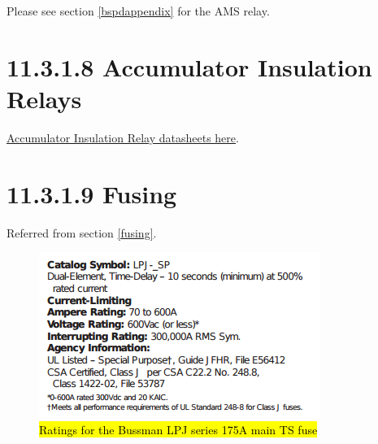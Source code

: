 \documentclass{article}
\DeclareRobustCommand{\hlr}[1]{{\sethlcolor{red}\hl{#1}}}
\begin{document}
Please see section \ref{bspdappendix} for the AMS relay.

\section*{11.3.1.8 Accumulator Insulation Relays}

\href{http://www.rec-bms.com/datasheet/Technical_datasheet_Kilovac.pdf}{Accumulator Insulation Relay datasheets here}.

\section*{11.3.1.9 Fusing} \label{fusingappendix}

Referred from section \ref{fusing}.

\begin{figure}[H]
    \centering
    \includegraphics{TSmainratings}
    \caption{\hlr{Ratings for the Bussman LPJ series 175A main TS fuse}}
    \label{mainTSfuseratings}
\end{figure}
\end{document}
